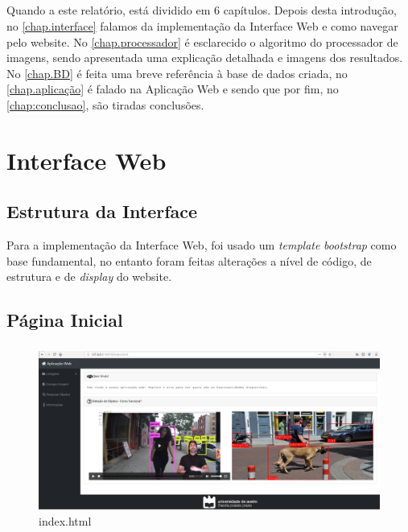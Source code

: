 \documentclass{report}
\begin{document}
\paragraph{}
Quando a este relatório, está dividido em 6 capítulos. Depois desta introdução, no \autoref{chap.interface} falamos da implementação da Interface Web e como navegar pelo website. No \autoref{chap.processador} é esclarecido o algoritmo do processador de imagens, sendo apresentada uma explicação detalhada e imagens dos resultados. \newline
No \autoref{chap.BD} é feita uma breve referência à base de dados criada, no \autoref{chap.aplicação} é falado na Aplicação Web e sendo que por fim, no \autoref{chap:conclusao}, são tiradas conclusões.


\chapter{Interface Web}
\label{chap.interface}

\section{Estrutura da Interface}
Para a implementação da Interface Web, foi usado um \textit{template} \textit{bootstrap}\cite{Template_Bootstrap} como base fundamental, no entanto foram feitas alterações a nível de código, de estrutura e de \textit{display} do website. 

\section{Página Inicial}
\paragraph{}

\begin{figure}[H]
\centering
\includegraphics[width=1\linewidth]{index.png}
\caption{index.html}
\end{figure}
\end{document}
